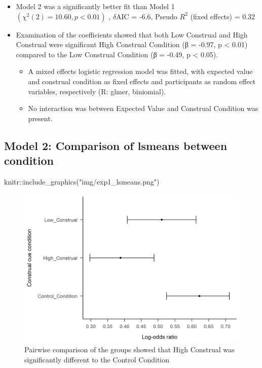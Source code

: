 \documentclass[
  letterpaper,
  DIV=11,
  numbers=noendperiod]{scrartcl}
\newenvironment{Shaded}{\begin{snugshade}}{\end{snugshade}}
\newcommand{\FunctionTok}[1]{\textcolor[rgb]{0.28,0.35,0.67}{#1}}
\newcommand{\NormalTok}[1]{\textcolor[rgb]{0.00,0.23,0.31}{#1}}
\newcommand{\SpecialCharTok}[1]{\textcolor[rgb]{0.37,0.37,0.37}{#1}}
\newcommand{\StringTok}[1]{\textcolor[rgb]{0.13,0.47,0.30}{#1}}
\begin{document}
\begin{itemize}
\item
  Model 2 was a significantly better fit than Model 1
  \((χ^2(2) = 10.60, p < 0.01)\) , \(\delta\)AIC = -6.6, Pseudo \(R^2\)
  (fixed effects) = 0.32
\item
  Examination of the coefficients showed that both Low Construal and
  High Construal were significant High Construal Condition (β = -0.97, p
  \textless{} 0.01) compared to the Low Construal Condition (β = -0.49,
  p \textless{} 0.05).

  \begin{itemize}
  \item
    A mixed effects logistic regression model was fitted, with expected
    value and construal condition as fixed effects and participants as
    random effect variables, respectively (R: glmer, biniomial).
  \item
    No interaction was between Expected Value and Construal Condition
    was present.
  \end{itemize}
\end{itemize}

\hypertarget{model-2-comparison-of-lsmeans-between-condition}{%
\subsection{Model 2: Comparison of lsmeans between
condition}\label{model-2-comparison-of-lsmeans-between-condition}}

\begin{Shaded}
\begin{Highlighting}[]
\NormalTok{knitr}\SpecialCharTok{::}\FunctionTok{include\_graphics}\NormalTok{(}\StringTok{"img/exp1\_lsmeans.png"}\NormalTok{)}
\end{Highlighting}
\end{Shaded}

\begin{figure}[H]

{\centering \includegraphics[width=2\textwidth,height=\textheight]{img/exp1_lsmeans.png}

}

\caption{Pairwise comparison of the groups showed that High Construal
was significantly different to the Control Condition}

\end{figure}
\end{document}

